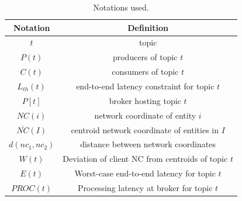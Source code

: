 \begin{table}[t]
	\center
		\begin{tabular}{ |c|c| } 
			\hline
			\textbf{Notation} & \textbf{Definition}\\ 
			\hline
			$t$ & topic\\
			$P\left( t \right)$ & producers of topic $t$\\
			$C\left( t \right)$ & consumers of topic $t$\\
			$L_{th}\left( t \right)$ & end-to-end latency constraint for topic $t$\\
			$P\left[ t \right]$ & broker hosting topic $t$\\
			$NC\left( i \right)$ & network coordinate of entity $i$\\
			$\overline{NC}\left( I \right)$ & centroid network coordinate of entities in $I$\\
			$d\left( nc_1, nc_2 \right)$ & distance between network coordinates\\
			$W\left( t \right)$ & Deviation of client NC from centroids of topic $t$\\
			$E\left( t \right)$ & Worst-case end-to-end latency for topic $t$\\
			$PROC \left( t \right)$ & Processing latency at broker for topic $t$\\
			\hline
		\end{tabular}
	\caption{Notations used.}\label{table:notations}
\end{table}

